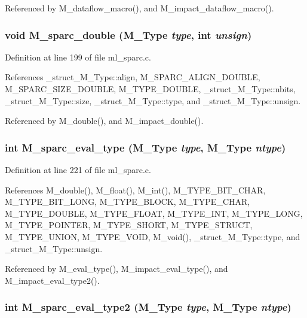 Referenced by M\_\-dataflow\_\-macro(), and M\_\-impact\_\-dataflow\_\-macro().
\subsubsection{\setlength{\rightskip}{0pt plus 5cm}void M\_\-sparc\_\-double (\bf{M\_\-Type} {\em type}, int {\em unsign})}\label{m__sparc_8h_0cd8a913d9be6dcc0756cf3d8dfb5f26}




Definition at line 199 of file ml\_\-sparc.c.

References \_\-struct\_\-M\_\-Type::align, M\_\-SPARC\_\-ALIGN\_\-DOUBLE, M\_\-SPARC\_\-SIZE\_\-DOUBLE, M\_\-TYPE\_\-DOUBLE, \_\-struct\_\-M\_\-Type::nbits, \_\-struct\_\-M\_\-Type::size, \_\-struct\_\-M\_\-Type::type, and \_\-struct\_\-M\_\-Type::unsign.

Referenced by M\_\-double(), and M\_\-impact\_\-double().
\subsubsection{\setlength{\rightskip}{0pt plus 5cm}int M\_\-sparc\_\-eval\_\-type (\bf{M\_\-Type} {\em type}, \bf{M\_\-Type} {\em ntype})}\label{m__sparc_8h_3cca9430c46864e8d84d8cfe186ab46e}




Definition at line 221 of file ml\_\-sparc.c.

References M\_\-double(), M\_\-float(), M\_\-int(), M\_\-TYPE\_\-BIT\_\-CHAR, M\_\-TYPE\_\-BIT\_\-LONG, M\_\-TYPE\_\-BLOCK, M\_\-TYPE\_\-CHAR, M\_\-TYPE\_\-DOUBLE, M\_\-TYPE\_\-FLOAT, M\_\-TYPE\_\-INT, M\_\-TYPE\_\-LONG, M\_\-TYPE\_\-POINTER, M\_\-TYPE\_\-SHORT, M\_\-TYPE\_\-STRUCT, M\_\-TYPE\_\-UNION, M\_\-TYPE\_\-VOID, M\_\-void(), \_\-struct\_\-M\_\-Type::type, and \_\-struct\_\-M\_\-Type::unsign.

Referenced by M\_\-eval\_\-type(), M\_\-impact\_\-eval\_\-type(), and M\_\-impact\_\-eval\_\-type2().
\subsubsection{\setlength{\rightskip}{0pt plus 5cm}int M\_\-sparc\_\-eval\_\-type2 (\bf{M\_\-Type} {\em type}, \bf{M\_\-Type} {\em ntype})}\label{m__sparc_8h_d06c06a99f51a2b11000f60e14ec6f10}




